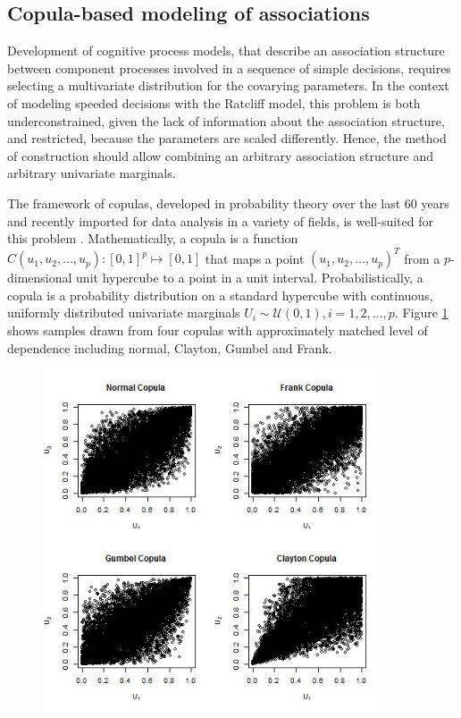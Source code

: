 \documentclass[12pt]{article}
\begin{document}
\subsection{Copula-based modeling of associations}

Development of cognitive process models, that describe an association
structure between component processes involved in a sequence of simple
decisions, requires selecting a multivariate distribution
for the covarying parameters. In the context of modeling speeded decisions with the Ratcliff model, this
problem is both underconstrained, given the lack of information about
the association structure, and restricted, because the
parameters are scaled differently. Hence, the method of
construction should allow combining an arbitrary association
structure and arbitrary univariate marginals. 

The framework of copulas, developed in probability theory over the
last 60 years and recently imported for data analysis in a variety of
fields, is well-suited for this problem
\citep{Skl1959,Joe1997,Nel2007,BerWoo2008}. Mathematically, a copula is a function
$C(u_1, u_2, \dots, u_p): [0, 1]^p \mapsto [0, 1]$ that maps a
point $(u_1, u_2, \ldots, u_p)^T$ from a
$p$-dimensional unit hypercube to a point in a unit interval.
Probabilistically, a copula is a probability distribution on a standard
hypercube with continuous, uniformly distributed univariate marginals
$U_i \sim \mathcal{U}(0, 1), i = 1, 2, \dots, p$. Figure \ref{fig:copula} shows samples drawn from four copulas with approximately matched level of dependence including normal, Clayton, Gumbel and Frank. 

\begin{figure}
\centering
\includegraphics[width=0.9\textwidth]{4_Copulas}
\caption{}
\label{fig:copula}
\end{figure}
\end{document}
